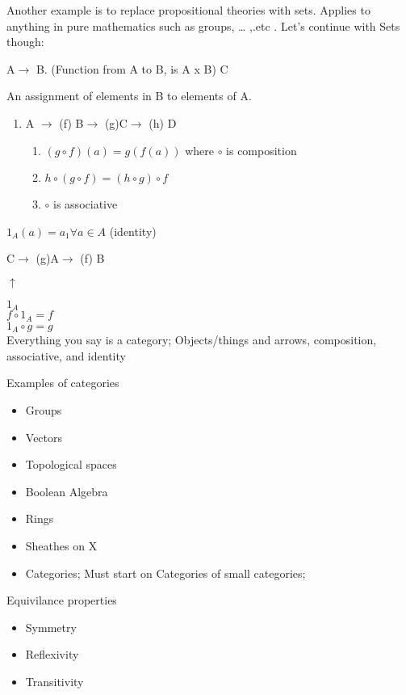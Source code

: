 \documentclass[11pt]{article}
\begin{document}
Another example is to replace propositional theories with sets. Applies to anything 
in pure mathematics such as groups, \ldots{} ,.etc . Let's continue with Sets though:

A\(\rightarrow\) B. (Function from A to B, is A x B)
C

An assignment of elements in B to elements of A.

\begin{enumerate}
\item A \(\rightarrow\) (f) B\(\rightarrow\) (g)C\(\rightarrow\) (h) D
\begin{enumerate}
\item \((g \circ f)(a) = g(f(a))\) where \(\circ\) is composition
\item \(h \circ(g\circ f) = (h\circ g)\circ f\)
\item \(\circ\) is associative
\end{enumerate}
\end{enumerate}

\(1_A(a)=a_1 \forall a \in A\) (identity)

C\(\rightarrow\) (g)A\(\rightarrow\) (f) B

\(\uparrow\)

\(1_A\)\\
\(f \circ 1_A = f\)\\
\(1_A \circ g = g\)\\

Everything you say is a category; Objects/things and arrows, composition, associative, and identity

Examples of categories
\begin{itemize}
\item Groups
\item Vectors
\item Topological spaces
\item Boolean Algebra
\item Rings
\item Sheathes on X
\item Categories; Must start on Categories of small categories;
\end{itemize}

Equivilance properties
\begin{itemize}
\item Symmetry
\item Reflexivity
\item Transitivity
\end{itemize}
\end{document}
